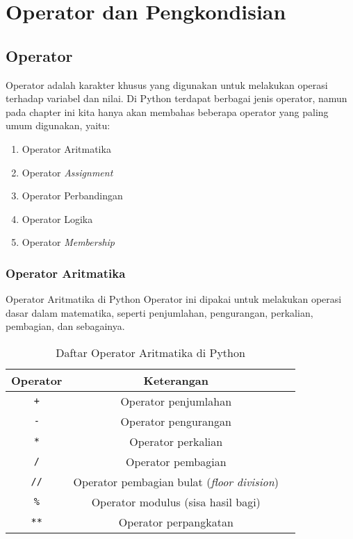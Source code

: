\chapter{Operator dan Pengkondisian}

\section{Operator}
Operator adalah karakter khusus yang digunakan untuk melakukan operasi terhadap variabel dan nilai. Di Python terdapat berbagai jenis operator, namun pada chapter ini kita hanya akan membahas beberapa operator yang paling umum digunakan, yaitu:

\begin{enumerate}
    \item Operator Aritmatika
    \item Operator \textit{Assignment}
    \item Operator Perbandingan
    \item Operator Logika
    \item Operator \textit{Membership}
\end{enumerate}

\subsection{Operator Aritmatika}
\begin{frame}[fragile]{Operator Aritmatika di Python}
Operator ini dipakai untuk melakukan operasi dasar dalam matematika, seperti penjumlahan, pengurangan, perkalian, pembagian, dan sebagainya.

\end{frame}

\begin{table}[H]
\centering
\begin{tabular}{|c|c|c|}
\hline
\textbf{Operator} & \textbf{Keterangan} \\
\hline
\texttt{+} & Operator penjumlahan \\
\hline
\texttt{-} & Operator pengurangan \\
\hline
\texttt{*} & Operator perkalian \\
\hline
\texttt{/} & Operator pembagian \\
\hline
\texttt{//} & Operator pembagian bulat (\textit{floor division}) \\
\hline
\texttt{\%} & Operator modulus (sisa hasil bagi) \\
\hline
\texttt{**} & Operator perpangkatan \\
\hline
\end{tabular}
\caption{Daftar Operator Aritmatika di Python}
\end{table}

